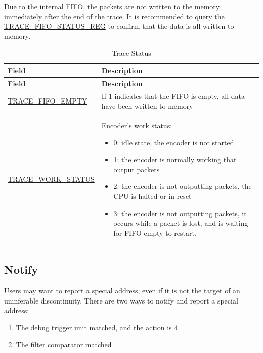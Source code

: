\documentclass[main\_\_EN.tex]{subfiles}
\begin{document}
Due to the internal FIFO, the packets are not written to the memory immediately after the end of the trace. It is recommended to query the \hyperref[regdesc:TRACEFIFOSTATUSREG]{TRACE\_FIFO\_STATUS\_REG} to confirm that the data is all written to memory.

\begin{longtable}[c]{ |l|L{10cm}| }
    \caption{Trace Status}
    \label{riscvtracenc-trace-status}
    \\\hline{}
    \textbf{Field} & \textbf{Description} \\\hline
    \endfirsthead
    \textbf{Field} & \textbf{Description} \\\hline
    \endhead
    \endfoot
    \endlastfoot

    \hyperref[fielddesc:TRACEFIFOEMPTY]{TRACE\_FIFO\_EMPTY} & If 1 indicates that the FIFO is empty, all data have been written to memory \\\hline
    \hyperref[fielddesc:TRACEWORKSTATUS]{TRACE\_WORK\_STATUS} & Encoder's work status:
    \begin{itemize}
        \item 0: idle state, the encoder is not started
        \item 1: the encoder is normally working that output packets
        \item 2: the encoder is not outputting packets, the CPU is halted or in reset
        \item 3: the encoder is not outputting packets, it occurs while a packet is lost, and is waiting for FIFO empty to restart.
    \end{itemize}
    \\\hline

\end{longtable}

\subsection{Notify}

Users may want to report a special address, even if it is not the target of an uninferable discontinuity. There are two ways to notify and report a special address:
\begin{enumerate}
    \item The debug trigger unit matched, and the \hyperref[fielddesc:MCONTROLACTION]{action} is 4
    \item The filter comparator matched
\end{enumerate}
\end{document}
